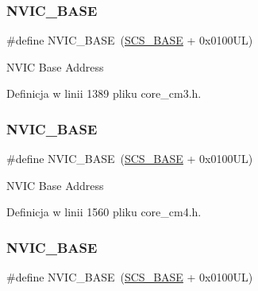 \subsubsection{\texorpdfstring{N\+V\+I\+C\+\_\+\+B\+A\+SE}{NVIC\_BASE}\hspace{0.1cm}{\footnotesize\ttfamily [8/12]}}
{\footnotesize\ttfamily \#define N\+V\+I\+C\+\_\+\+B\+A\+SE~(\hyperlink{group___c_m_s_i_s__core__base_ga3c14ed93192c8d9143322bbf77ebf770}{S\+C\+S\+\_\+\+B\+A\+SE} +  0x0100\+U\+L)}

N\+V\+IC Base Address 

Definicja w linii 1389 pliku core\+\_\+cm3.\+h.

\mbox{\label{group___c_m_s_i_s__core__base_gaa0288691785a5f868238e0468b39523d}} 
\subsubsection{\texorpdfstring{N\+V\+I\+C\+\_\+\+B\+A\+SE}{NVIC\_BASE}\hspace{0.1cm}{\footnotesize\ttfamily [9/12]}}
{\footnotesize\ttfamily \#define N\+V\+I\+C\+\_\+\+B\+A\+SE~(\hyperlink{group___c_m_s_i_s__core__base_ga3c14ed93192c8d9143322bbf77ebf770}{S\+C\+S\+\_\+\+B\+A\+SE} +  0x0100\+U\+L)}

N\+V\+IC Base Address 

Definicja w linii 1560 pliku core\+\_\+cm4.\+h.

\mbox{\label{group___c_m_s_i_s__core__base_gaa0288691785a5f868238e0468b39523d}} 
\subsubsection{\texorpdfstring{N\+V\+I\+C\+\_\+\+B\+A\+SE}{NVIC\_BASE}\hspace{0.1cm}{\footnotesize\ttfamily [10/12]}}
{\footnotesize\ttfamily \#define N\+V\+I\+C\+\_\+\+B\+A\+SE~(\hyperlink{group___c_m_s_i_s__core__base_ga3c14ed93192c8d9143322bbf77ebf770}{S\+C\+S\+\_\+\+B\+A\+SE} +  0x0100\+U\+L)}

